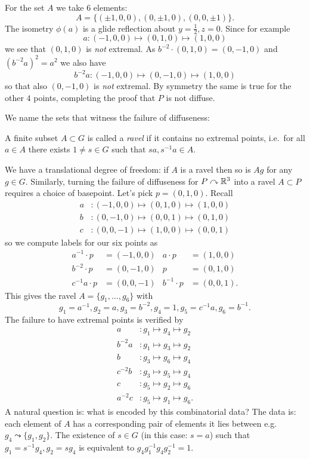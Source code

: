 For the set $A$ we take $6$ elements:\[
    A = \{ (\pm 1, 0, 0), (0, \pm 1, 0), (0, 0, \pm 1) \}.
\]
The isometry $\phi(a)$ is a glide reflection about $y = \frac{1}{2}, z = 0$.
Since for example \[
    a \colon (-1, 0, 0) \mapsto (0, 1, 0) \mapsto (1, 0, 0)
\] we see that $(0, 1, 0)$ is \emph{not} extremal.
As $b^{-2} \cdot (0, 1, 0) = (0, -1, 0)$ and $(b^{-2} a)^2 = a^2$ we also have \[
    b^{-2} a \colon (-1, 0, 0) \mapsto (0, -1, 0) \mapsto (1, 0, 0)
\] so that also $(0, -1, 0)$ is \emph{not} extremal.
By symmetry the same is true for the other $4$ points, completing the proof that $P$ is not diffuse.

We name the sets that witness the failure of diffuseness:

\begin{definition}
    A finite subset $A \subset G$ is called a \emph{ravel} if it contains no extremal points, i.e.\ for all $a \in A$ there exists $1 \neq s \in G$ such that $sa, s^{-1}a \in A$.
\end{definition}

We have a translational degree of freedom: if $A$ is a ravel then so is $Ag$ for any $g \in G$.
Similarly, turning the failure of diffuseness for $P \curvearrowright \mathbb{R}^3$ into a ravel $A \subset P$ requires a choice of basepoint.
Let's pick $p = (0, 1, 0)$.
Recall
\begin{align*}
    a &\colon (-1, 0, 0) \mapsto (0, 1, 0) \mapsto (1, 0, 0) \\
    b &\colon (0, -1, 0) \mapsto (0, 0, 1) \mapsto (0, 1, 0) \\
    c &\colon (0, 0, -1) \mapsto (1, 0, 0) \mapsto (0, 0, 1)
\end{align*}
so we compute labels for our six points as
\begin{align*}
    a^{-1} \cdot p &= (-1, 0, 0) & a \cdot p &= (1, 0, 0) \\
    b^{-2} \cdot p &= (0, -1, 0) & p &= (0, 1, 0) \\
    c^{-1} a \cdot p &= (0, 0, -1) & b^{-1} \cdot p &= (0, 0, 1).
\end{align*}
This gives the ravel $A = \{g_1, \dots, g_6\}$ with \[
    g_1 = a^{-1}, g_2 = a, g_3 = b^{-2}, g_4 = 1, g_5 = c^{-1} a, g_6 = b^{-1}.
\]
The failure to have extremal points is verified by
\begin{align*}
    a &\colon g_1 \mapsto g_4 \mapsto g_2 \\
    b^{-2} a &\colon g_1 \mapsto g_3 \mapsto g_2 \\
    b &\colon g_3 \mapsto g_6 \mapsto g_4 \\
    c^{-2} b &\colon g_3 \mapsto g_5 \mapsto g_4 \\
    c &\colon g_5 \mapsto g_2 \mapsto g_6 \\
    a^{-2} c &\colon g_5 \mapsto g_1 \mapsto g_6.
\end{align*}
A natural question is: what is encoded by this combinatorial data?
The data is: each element of $A$ has a corresponding pair of elements it lies between e.g.\ $g_4 \leadsto \{ g_1, g_2 \}$.
The existence of $s \in G$ (in this case: $s = a$) such that $g_1 = s^{-1} g_4, g_2 = s g_4$ is equivalent to $g_4 g_1^{-1} g_4 g_2^{-1} = 1$.

